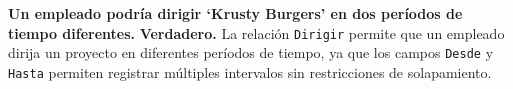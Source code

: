\textbf{Un empleado podría dirigir ‘Krusty Burgers’ en dos períodos de tiempo diferentes.}\vspace{.3cm}
\textbf{Verdadero.} La relación \texttt{Dirigir} permite que un empleado dirija un proyecto en diferentes períodos de tiempo, ya que los campos \texttt{Desde} y \texttt{Hasta} permiten registrar múltiples intervalos sin restricciones de solapamiento.
